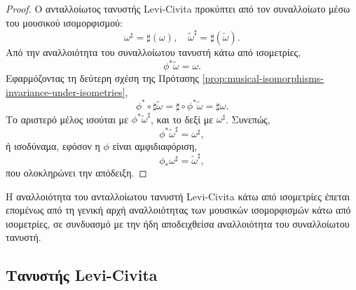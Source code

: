 \documentclass[11pt,a4paper,twoside,openright]{book}
\begin{document}
\begin{proof}
Ο ανταλλοίωτος τανυστής Levi-Civita προκύπτει από τον συναλλοίωτο μέσω του μουσικού ισομορφισμού:
\begin{equation*}
\omega^\sharp = \sharp(\omega),
\quad
\widetilde{\omega}^\sharp = \sharp(\widetilde{\omega}).
\end{equation*}
Από την αναλλοιότητα του συναλλοίωτου τανυστή κάτω από ισομετρίες,
\begin{equation*}
\phi^* \widetilde{\omega} = \omega.
\end{equation*}
Εφαρμόζοντας τη δεύτερη σχέση της Πρότασης \ref{prop:musical-isomorphisms-invariance-under-isometries},
\begin{equation*}
\phi^* \circ \sharp \widetilde{\omega} = \sharp \circ \phi^* \widetilde{\omega} = \sharp \omega.
\end{equation*}
Το αριστερό μέλος ισούται με $\phi^* \widetilde{\omega}^\sharp$, και το δεξί με $\omega^\sharp$. Συνεπώς,
\begin{equation*}
\phi^* \widetilde{\omega}^\sharp = \omega^\sharp,
\end{equation*}
ή ισοδύναμα, εφόσον η $\phi$ είναι αμφιδιαφόριση,
\begin{equation*}
\phi_* \omega^\sharp = \widetilde{\omega}^\sharp,
\end{equation*}
που ολοκληρώνει την απόδειξη.
\end{proof}

\noindent
Η αναλλοιότητα του ανταλλοίωτου τανυστή Levi-Civita κάτω από ισομετρίες έπεται επομένως από τη γενική αρχή αναλλοιότητας των μουσικών ισομορφισμών κάτω από ισομετρίες, σε συνδυασμό με την ήδη αποδειχθείσα αναλλοιότητα του συναλλοίωτου τανυστή.

\subsection{Τανυστής Levi-Civita}
	\label{sec:levi-civita-tensor}
	
\end{document}
